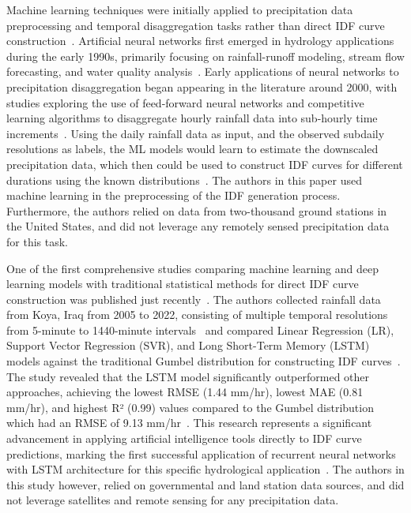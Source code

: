 Machine learning techniques were initially applied to precipitation data preprocessing and temporal disaggregation tasks rather than direct IDF curve construction~\cite{geosciences9050209}. Artificial neural networks first emerged in hydrology applications during the early 1990s, primarily focusing on rainfall-runoff modeling, stream flow forecasting, and water quality analysis~\cite{doi:10.1061}. Early applications of neural networks to precipitation disaggregation began appearing in the literature around 2000, with studies exploring the use of feed-forward neural networks and competitive learning algorithms to disaggregate hourly rainfall data into sub-hourly time increments~\cite{geosciences9050209,doi:10.1061}. Using the daily rainfall data as input, and the observed subdaily resolutions as labels, the ML models would learn to estimate the downscaled precipitation data, which then could be used to construct IDF curves for different durations using the known distributions~\cite{geosciences9050209}.
The authors in this paper used machine learning in the preprocessing of the IDF generation process. Furthermore, the authors relied on data from two-thousand ground stations in the United States, and did not leverage any remotely sensed precipitation data for this task.

\vspace{1em}

One of the first comprehensive studies comparing machine learning and deep learning models with traditional statistical methods for direct IDF curve construction was published just recently~\cite{idfkoya}. The authors collected rainfall data from Koya, Iraq from 2005 to 2022, consisting of multiple temporal resolutions from 5-minute to 1440-minute intervals~\cite{idfkoya} and compared Linear Regression (LR), Support Vector Regression (SVR), and Long Short-Term Memory (LSTM) models against the traditional Gumbel distribution for constructing IDF curves~\cite{idfkoya}. The study revealed that the LSTM model significantly outperformed other approaches, achieving the lowest RMSE (1.44 mm/hr), lowest MAE (0.81 mm/hr), and highest R² (0.99) values compared to the Gumbel distribution which had an RMSE of 9.13 mm/hr~\cite{idfkoya}. This research represents a significant advancement in applying artificial intelligence tools directly to IDF curve predictions, marking the first successful application of recurrent neural networks with LSTM architecture for this specific hydrological application~\cite{idfkoya}. The authors in this study however, relied on governmental and land station data sources, and did not leverage satellites and remote sensing for any precipitation data.